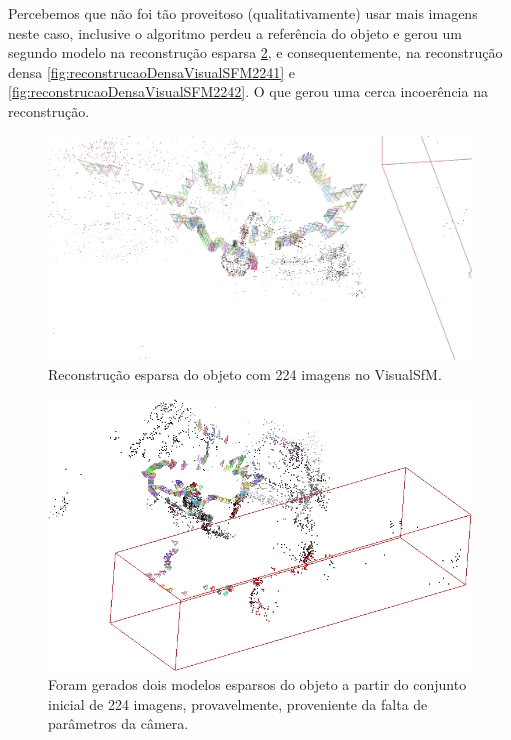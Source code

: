 Percebemos que não foi tão proveitoso (qualitativamente) usar mais imagens neste caso, inclusive o algoritmo perdeu a referência do objeto e gerou um segundo modelo na reconstrução esparsa \ref{fig:reconstrucaoEsparsaVisualSFM224}, e consequentemente, na reconstrução densa \ref{fig:reconstrucaoDensaVisualSFM2241} e \ref{fig:reconstrucaoDensaVisualSFM2242}. O que gerou uma cerca incoerência na reconstrução.

\begin{figure}[!h]
	\centering
	\includegraphics[width=0.5\linewidth]{figs/perto_longe_esparsa.jpg}
	\caption{%
	Reconstrução esparsa do objeto com 224 imagens no VisualSfM.
	}\label{fig:reconstrucaoEsparsaVisualSFM224}
\end{figure}

\begin{figure}[!h]
	\centering
	\includegraphics[width=0.5\linewidth]{figs/perto_longe_esparsa_2.jpg}
	\caption{%
	Foram gerados dois modelos esparsos do objeto a partir do conjunto inicial de 224 imagens, provavelmente, proveniente da falta de parâmetros da câmera.
	}\label{fig:reconstrucaoEsparsaVisualSFM224}
\end{figure}

